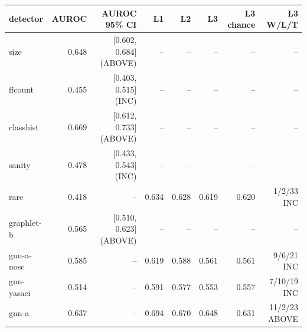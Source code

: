 \begin{tabular}{lrrrrrrr}
\hline
detector & AUROC & AUROC 95\% CI & L1 & L2 & L3 & L3 chance & L3 W/L/T \\
\hline
size & 0.648 & [0.602, 0.684] (ABOVE) & -- & -- & -- & -- & -- \\
ffcount & 0.455 & [0.403, 0.515] (INC) & -- & -- & -- & -- & -- \\
classhist & 0.669 & [0.612, 0.733] (ABOVE) & -- & -- & -- & -- & -- \\
sanity & 0.478 & [0.433, 0.543] (INC) & -- & -- & -- & -- & -- \\
rare & 0.418 & -- & 0.634 & 0.628 & 0.619 & 0.620 & 1/2/33 INC \\
graphlet{-}b & 0.565 & [0.510, 0.623] (ABOVE) & -- & -- & -- & -- & -- \\
gnn{-}a{-}nosc & 0.585 & -- & 0.619 & 0.588 & 0.561 & 0.561 & 9/6/21 INC \\
gnn{-}yasaei & 0.514 & -- & 0.591 & 0.577 & 0.553 & 0.557 & 7/10/19 INC \\
gnn{-}a & 0.637 & -- & 0.694 & 0.670 & 0.648 & 0.631 & 11/2/23 ABOVE \\
\hline
\end{tabular}
